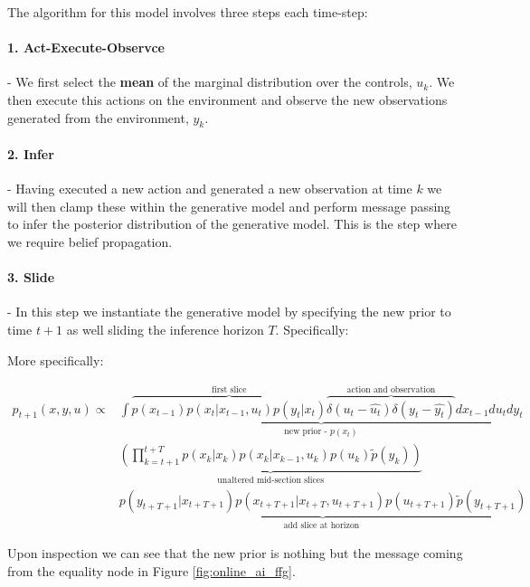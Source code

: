 \documentclass{article}
\begin{document}
The algorithm for this model involves three steps each time-step:

\paragraph{1. Act-Execute-Observce} - We first select the \textbf{mean} of the marginal distribution over the controls, $u_k$. We then execute this actions on the environment and observe the new observations generated from the environment, $y_k$.

\paragraph{2. Infer} - Having executed a new action and generated a new observation at time $k$ we will then clamp these within the generative model and perform message passing to infer the posterior distribution of the generative model. This is the step where we require belief propagation.  

\paragraph{3. Slide} - In this step we instantiate the generative model by specifying the new prior to time $t+1$ as well sliding the inference horizon $T$. Specifically:

More specifically:


\begin{equation}
\begin{aligned}
    p_{t+1}(x, y, u) \propto 
    &\underbrace{\int \overbrace{p\left(x_{t-1}\right) p\left(x_t | x_{t-1}, u_t\right) p\left(y_t | x_t\right)}^{\text{first slice}} 
    \overbrace{\delta\left(u_t - \widehat{u_t}\right) \delta\left(y_t - \widehat{y_t}\right)}^{\text{action and observation}} dx_{t-1} du_t dy_t}_{\text{new prior - } p(x_t)} \\
    &\underbrace{\left(\prod_{k=t+1}^{t+T} p\left(x_k | x_k\right) p\left(x_k | x_{k-1}, u_k \right) p\left(u_k\right) \tilde{p}\left(y_k\right)\right)}_{\text{unaltered mid-section slices}} \\
    &\underbrace{p\left(y_{t+T+1} | x_{t+T+1}\right) p\left(x_{t+T+1} | x_{t+T}, u_{t+T+1}\right) p\left(u_{t+T+1}\right) \tilde{p}\left(y_{t+T+1}\right)}_{\text {add slice at horizon }}
\end{aligned}
\end{equation}

Upon inspection we can see that the new prior is nothing but the message coming from the equality node in Figure \ref{fig:online_ai_ffg}. 
\end{document}
